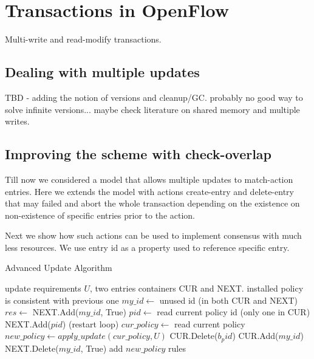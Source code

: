 \documentclass[conference]{sigcomm-alternate}
\begin{document}
\section{Transactions in OpenFlow}\label{sec:sync}

Multi-write and read-modify transactions.

\subsection{Dealing with multiple updates}

TBD - adding the notion of versions and cleanup/GC. probably no good way to solve infinite versions... maybe check literature on shared memory and multiple writes.


\subsection{Improving the scheme with check-overlap}\label{sec:todo}
Till now we considered a model that allows multiple updates to match-action entries. Here we extends the model with actions create-entry and delete-entry that may failed and abort the whole transaction depending on the existence on non-existence of specific entries prior to the action.

Next we show how such actions can be used to implement consensus with much less resources. We use entry id as a property used to reference specific entry.


\begin{algorithm}[t]
    \caption{Advanced Update Algorithm}
    \label{alg:template}
    \begin{algorithmic}[1]
    \Require update requirements $U$, two entries containers CUR and NEXT.
    \Ensure installed policy is consistent with previous one
    \Repeat
			\State $my\_id\gets$ unused id (in both CUR and NEXT)
    		\State $res \gets $ NEXT.Add($my\_id$, True)
 		\Repeat
 			\State $pid\gets$ read current policy id (only one in CUR)
 			\State NEXT.Add($pid$)
 				 (restart loop)
 			\EndIf
 			\State $cur\_policy\gets$ read current policy
 			\State $new\_policy\gets apply\_update(cur\_policy,U)$
 			\startTransaction
	 			\State CUR.Delete($b_pid$)
	 			\State CUR.Add($my\_id$)
				\State NEXT.Delete($my\_id$, True)
	 			\State add $new\_policy$ rules %
 			\endTransaction
			\Return 

    \end{algorithmic}
\end{algorithm}
\end{document}
